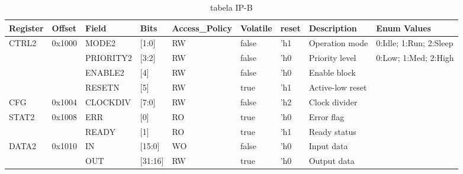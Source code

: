 \documentclass{article}
\begin{document}
\begin{table}[h]
\centering
\caption{tabela IP-B}
\label{table:IP-B}
\fontsize{7}{10}\selectfont
\begin{tabular}{|l|l|l|l|l|l|l|l|l|}
\hline
\textbf{Register} & \textbf{Offset} & \textbf{Field} & \textbf{Bits} & \textbf{Access\_Policy} & \textbf{Volatile} & \textbf{reset} & \textbf{Description} & \textbf{Enum Values} \\ \hline
\multirow{4}{*}{CTRL2} & \multirow{4}{*}{0x1000} & MODE2     & [1:0]  & RW  & false & 'h1  & Operation mode      & 0:Idle; 1:Run; 2:Sleep \\ \cline{3-9}
        &        & PRIORITY2  & [3:2]  & RW  & false & 'h0  & Priority level      & 0:Low; 1:Med; 2:High    \\ \cline{3-9}
        &        & ENABLE2   & [4]    & RW  & false & 'h0  & Enable block        &                         \\ \cline{3-9}
        &        & RESETN    & [5]    & RW  & true  & 'h1  & Active-low reset    &                         \\ \hline
CFG     & 0x1004 & CLOCKDIV  & [7:0]  & RW  & false & 'h2  & Clock divider       &                         \\ \hline
\multirow{2}{*}{STAT2} & \multirow{2}{*}{0x1008} & ERR       & [0]    & RO  & true  & 'h0  & Error flag          &                         \\ \cline{3-9}
        &        & READY     & [1]    & RO  & true  & 'h1  & Ready status        &                         \\ \hline
\multirow{2}{*}{DATA2} & \multirow{2}{*}{0x1010} & IN      & [15:0] & WO  & false & 'h0  & Input data          &                         \\ \cline{3-9}
        &        & OUT       & [31:16]& RW  & true  & 'h0  & Output data         &                         \\ \hline
\end{tabular}
\end{table}
\end{document}
